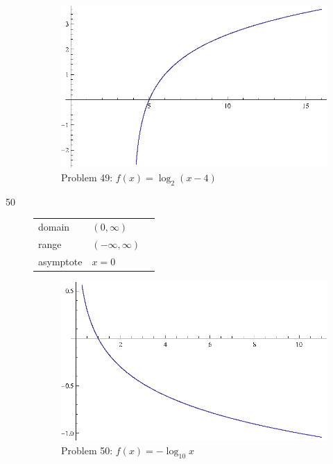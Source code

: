 \documentclass{exam}
\begin{document}
\begin{description}
      \begin{figure}[H]
        \centering
        \includegraphics[scale = 0.9]{problem49.eps}
        \caption{Problem 49: $f(x) = \log_2(x - 4)$}
      \end{figure}

    \pagebreak

    \item[50]
      \begin{tabular}[H]{lll}
        \toprule
        domain    & $(0, \infty)$ \\
        range     & $(-\infty, \infty)$ \\
        asymptote & $x = 0$ \\
        \bottomrule
      \end{tabular}

      \begin{figure}[H]
        \centering
        \includegraphics[scale = 0.9]{problem50.eps}
        \caption{Problem 50: $f(x) = -\log_{10} x$}
      \end{figure}


\end{description}
\end{document}
